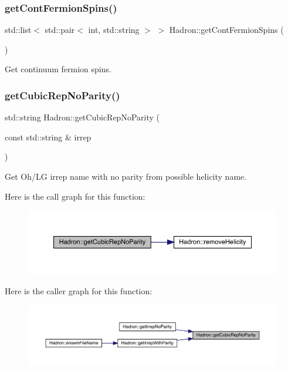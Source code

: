 \subsubsection{\texorpdfstring{getContFermionSpins()}{getContFermionSpins()}}
{\footnotesize\ttfamily std\+::list$<$ std\+::pair$<$ int, std\+::string $>$ $>$ Hadron\+::get\+Cont\+Fermion\+Spins (\begin{DoxyParamCaption}{ }\end{DoxyParamCaption})}



Get continuum fermion spins. 

\mbox{\label{namespaceHadron_a6efae379facc253e72b35cf4d235dc88}} 
\subsubsection{\texorpdfstring{getCubicRepNoParity()}{getCubicRepNoParity()}}
{\footnotesize\ttfamily std\+::string Hadron\+::get\+Cubic\+Rep\+No\+Parity (\begin{DoxyParamCaption}\item[{const std\+::string \&}]{irrep }\end{DoxyParamCaption})}



Get Oh/\+LG irrep name with no parity from possible helicity name. 

Here is the call graph for this function\+:\nopagebreak
\begin{figure}[H]
\begin{center}
\leavevmode
\includegraphics[width=350pt]{d1/daf/namespaceHadron_a6efae379facc253e72b35cf4d235dc88_cgraph}
\end{center}
\end{figure}
Here is the caller graph for this function\+:\nopagebreak
\begin{figure}[H]
\begin{center}
\leavevmode
\includegraphics[width=350pt]{d1/daf/namespaceHadron_a6efae379facc253e72b35cf4d235dc88_icgraph}
\end{center}
\end{figure}
\mbox{\label{namespaceHadron_af18d764aba83c32e26a22d75ed2dfbf7}} 
